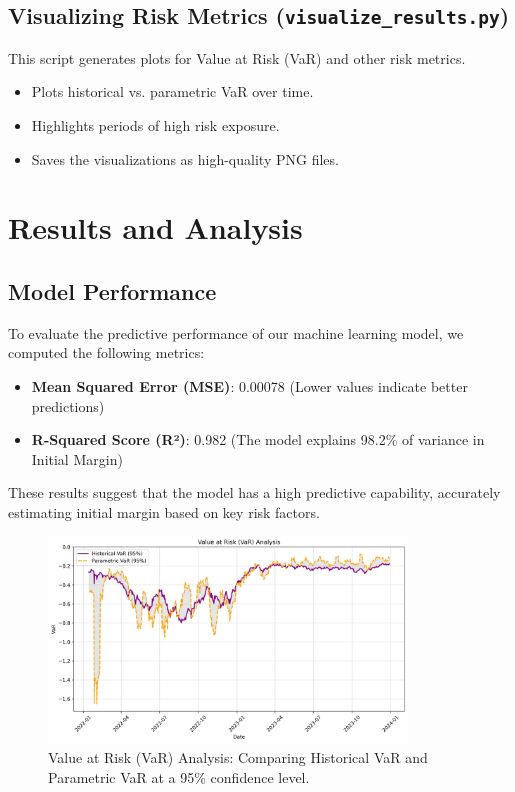 \documentclass[a4paper,12pt]{article}
\begin{document}
\subsection{Visualizing Risk Metrics (\texttt{visualize\_results.py})}
This script generates plots for Value at Risk (VaR) and other risk metrics.
\begin{itemize}
    \item Plots historical vs. parametric VaR over time.
    \item Highlights periods of high risk exposure.
    \item Saves the visualizations as high-quality PNG files.
\end{itemize}





\section{Results and Analysis}

\subsection{Model Performance}
To evaluate the predictive performance of our machine learning model, we computed the following metrics:
\begin{itemize}
    \item \textbf{Mean Squared Error (MSE)}: 0.00078 (Lower values indicate better predictions)
    \item \textbf{R-Squared Score (R²)}: 0.982 (The model explains 98.2\% of variance in Initial Margin)
\end{itemize}
These results suggest that the model has a high predictive capability, accurately estimating initial margin based on key risk factors.

\FloatBarrier
\begin{figure}[h]
    \centering
    \includegraphics[width=0.85\textwidth]{value_at_risk_analysis.png}
    \caption{Value at Risk (VaR) Analysis: Comparing Historical VaR and Parametric VaR at a 95\% confidence level.}
    \label{fig:var_analysis}
\end{figure}
\FloatBarrier
\end{document}
